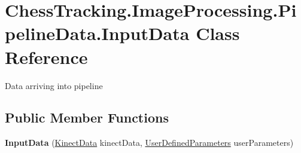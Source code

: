 \hypertarget{class_chess_tracking_1_1_image_processing_1_1_pipeline_data_1_1_input_data}{}\section{Chess\+Tracking.\+Image\+Processing.\+Pipeline\+Data.\+Input\+Data Class Reference}
\label{class_chess_tracking_1_1_image_processing_1_1_pipeline_data_1_1_input_data}


Data arriving into pipeline  


\subsection*{Public Member Functions}
\begin{DoxyCompactItemize}
\item 
\mbox{\label{class_chess_tracking_1_1_image_processing_1_1_pipeline_data_1_1_input_data_a8b8246346a74855bc6d9b48f2119f55e}} 
{\bfseries Input\+Data} (\mbox{\hyperlink{class_chess_tracking_1_1_image_processing_1_1_pipeline_data_1_1_kinect_data}{Kinect\+Data}} kinect\+Data, \mbox{\hyperlink{class_chess_tracking_1_1_image_processing_1_1_pipeline_data_1_1_user_defined_parameters}{User\+Defined\+Parameters}} user\+Parameters)
\end{DoxyCompactItemize}
